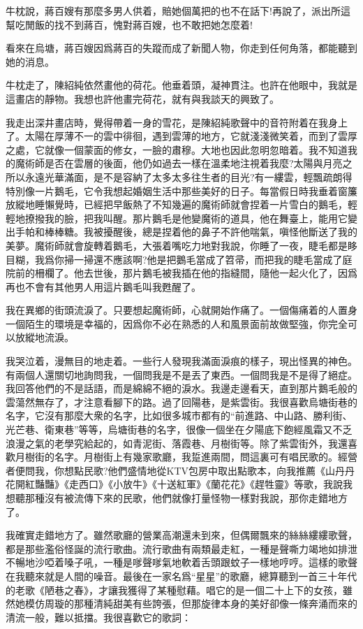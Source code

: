 \documentclass[a6paper]{article}
\begin{document}
牛枕說，蔣百嫂有那麼多男人供着，賠她個萬把的也不在話下!再說了，派出所這幫吃閒飯的找不到蔣百，愧對蔣百嫂，也不敢把她怎麼着!

看來在烏塘，蔣百嫂因爲蔣百的失蹤而成了新聞人物，你走到任何角落，都能聽到她的消息。

牛枕走了，陳紹純依然畫他的荷花。他垂着頭，凝神貫注。也許在他眼中，我就是這畫店的靜物。我想也許他畫完荷花，就有與我談天的興致了。

我走出深井畫店時，覺得帶着一身的雪花，是陳紹純歌聲中的音符附着在我身上了。太陽在厚薄不一的雲中徘徊，遇到雲薄的地方，它就淺淺微笑着，而到了雲厚之處，它就像一個蒙面的修女，一臉的肅穆。大地也因此忽明忽暗着。我不知道我的魔術師是否在雲層的後面，他仍如過去一樣在溫柔地注視着我麼?太陽與月亮之所以永遠光華滿面，是不是容納了太多太多往生者的目光?有一縷雲，輕飄疏朗得特別像一片鵝毛，它令我想起婚姻生活中那些美好的日子。每當假日時我垂着窗簾放縱地睡懶覺時，已經把早飯熱了不知幾遍的魔術師就會捏着一片雪白的鵝毛，輕輕地撩撥我的臉，把我叫醒。那片鵝毛是他變魔術的道具，他在舞臺上，能用它變出手帕和棒棒糖。我被擾醒後，總是捏着他的鼻子不許他喘氣，嗔怪他斷送了我的美夢。魔術師就會旋轉着鵝毛，大張着嘴吃力地對我說，你睡了一夜，睫毛都是眵目糊，我爲你掃一掃還不應該啊?他是把鵝毛當成了笤帚，而把我的睫毛當成了庭院前的柵欄了。他去世後，那片鵝毛被我插在他的指縫間，隨他一起火化了，因爲再也不會有其他男人用這片鵝毛叫我甦醒了。

我在異鄉的街頭流淚了。只要想起魔術師，心就開始作痛了。一個傷痛着的人置身一個陌生的環境是幸福的，因爲你不必在熟悉的人和風景面前故做堅強，你完全可以放縱地流淚。

我哭泣着，漫無目的地走着。一些行人發現我滿面淚痕的樣子，現出怪異的神色。有兩個人還關切地詢問我，一個問我是不是丟了東西。一個問我是不是得了絕症。我回答他們的不是話語，而是綿綿不絕的淚水。我邊走邊看天，直到那片鵝毛般的雲蕩然無存了，才注意看腳下的路。過了回陽巷，是紫雲街。我很喜歡烏塘街巷的名字，它沒有那麼大衆的名字，比如很多城市都有的“前進路、中山路、勝利街、光芒巷、衛東巷”等等，烏塘街巷的名字，很像一個坐在夕陽底下飽經風霜又不乏浪漫之氣的老學究給起的，如青泥街、落霞巷、月樹街等。除了紫雲街外，我還喜歡月樹街的名字。月樹街上有幾家歌廳，我踅進兩間，問這裏可有唱民歌的。經營者便問我，你想點民歌?他們盛情地從KTV包房中取出點歌本，向我推薦《山丹丹花開紅豔豔》《走西口》《小放牛》《十送紅軍》《蘭花花》《趕牲靈》等歌，我說我想聽那種沒有被流傳下來的民歌，他們就像打量怪物一樣對我說，那你走錯地方了。

我確實走錯地方了。雖然歌廳的營業高潮還未到來，但偶爾飄來的絲絲縷縷歌聲，都是那些濫俗怪誕的流行歌曲。流行歌曲有兩類最走紅，一種是聲嘶力竭地如排泄不暢地沙啞着嗓子吼，一種是嗲聲嗲氣地軟着舌頭跟蚊子一樣地哼哼。這樣的歌聲在我聽來就是人間的噪音。最後在一家名爲“星星”的歌廳，總算聽到一首三十年代的老歌《陋巷之春》，才讓我獲得了某種慰藉。唱它的是一個二十上下的女孩，雖然她模仿周璇的那種清純甜美有些誇張，但那旋律本身的美好卻像一條奔涌而來的清流一般，難以抵擋。我很喜歡它的歌詞：
\end{document}
